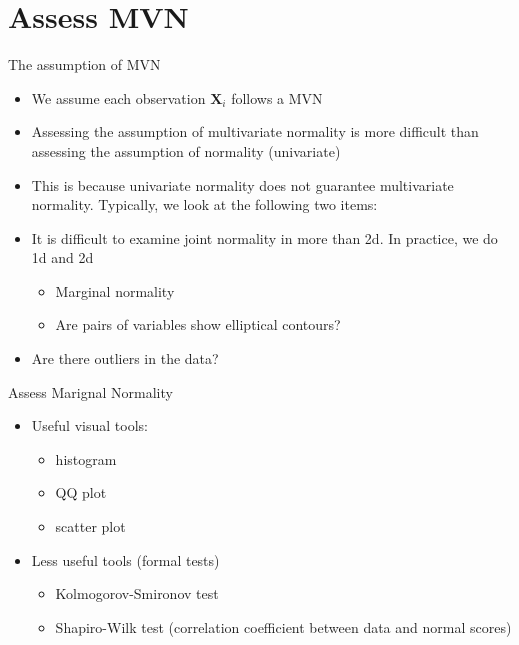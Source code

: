 \documentclass[
  ignorenonframetext,
]{beamer}
\providecommand{\tightlist}{%
  \setlength{\itemsep}{0pt}\setlength{\parskip}{0pt}}
\begin{document}
\hypertarget{assess-mvn}{%
\section{Assess MVN}\label{assess-mvn}}

\begin{frame}{The assumption of MVN}
\protect\hypertarget{the-assumption-of-mvn}{}
\begin{itemize}
\tightlist
\item
  We assume each observation \(\mathbf X_i\) follows a MVN
\item
  Assessing the assumption of multivariate normality is more difficult
  than assessing the assumption of normality (univariate)
\item
  This is because univariate normality does not guarantee multivariate
  normality. Typically, we look at the following two items:
\item
  It is difficult to examine joint normality in more than 2d. In
  practice, we do 1d and 2d

  \begin{itemize}
  \tightlist
  \item
    Marginal normality
  \item
    Are pairs of variables show elliptical contours?
  \end{itemize}
\item
  Are there outliers in the data?
\end{itemize}
\end{frame}

\begin{frame}{Assess Marignal Normality}
\protect\hypertarget{assess-marignal-normality}{}
\begin{itemize}
\tightlist
\item
  Useful visual tools:

  \begin{itemize}
  \tightlist
  \item
    histogram
  \item
    QQ plot
  \item
    scatter plot
  \end{itemize}
\item
  Less useful tools (formal tests)

  \begin{itemize}
  \tightlist
  \item
    Kolmogorov-Smironov test
  \item
    Shapiro-Wilk test (correlation coefficient between data and normal
    scores)
  \end{itemize}
\end{itemize}
\end{frame}
\end{document}
